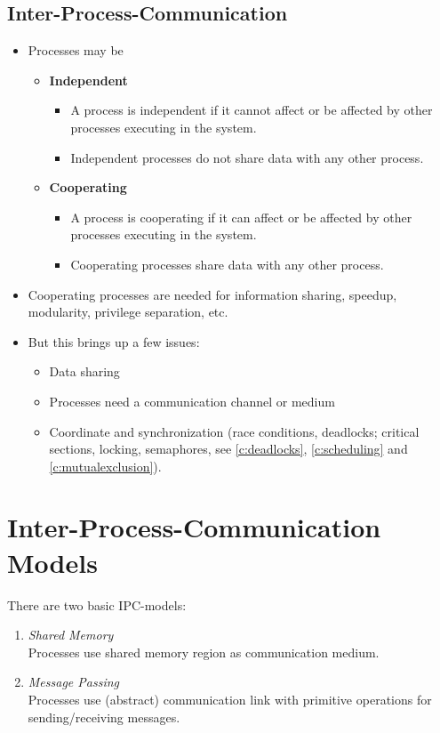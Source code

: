         \subsection{Inter-Process-Communication}
            \begin{itemize}
            	\item Processes may be
                	\begin{itemize}
                		\item \textbf{Independent}
	                		\begin{itemize}
	                			\item A process is independent if it cannot affect or be affected by other processes executing in the system.
	                			\item Independent processes do not share data with any other process.
	                		\end{itemize}
                		\item \textbf{Cooperating}
	                		\begin{itemize}
	                			\item A process is cooperating if it can affect or be affected by other processes executing in the system.
	                			\item Cooperating processes share data with any other process.
	                		\end{itemize}
                	\end{itemize}
            	\item Cooperating processes are needed for information sharing, speedup, modularity, privilege separation, etc.
            	\item But this brings up a few issues:
                	\begin{itemize}
                		\item Data sharing
                		\item Processes need a communication channel or medium
                		\item Coordinate and synchronization (race conditions, deadlocks; critical sections, locking, semaphores, see \ref{c:deadlocks}, \ref{c:scheduling} and \ref{c:mutualexclusion}).
                	\end{itemize}
            \end{itemize}

    \section{Inter-Process-Communication Models}
        There are two basic IPC-models:
        \begin{enumerate}
        	\item \textit{Shared Memory} \\ Processes use shared memory region as communication medium.
        	\item \textit{Message Passing} \\ Processes use (abstract) communication link with primitive operations for sending/receiving messages.
        \end{enumerate}

